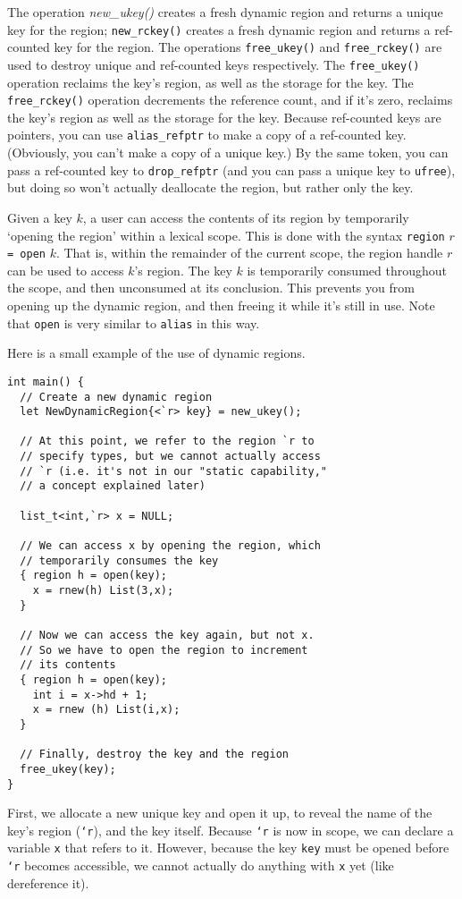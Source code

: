The operation \emph{new\_ukey()} creates a fresh dynamic region and returns
a unique key for the region; \texttt{new\_rckey()} creates a fresh dynamic
region and returns a ref-counted key for the region.  The operations
\texttt{free\_ukey()} and \texttt{free\_rckey()} are used to destroy unique
and ref-counted keys respectively.  The \texttt{free\_ukey()} operation
reclaims the key's region, as well as the storage for the key.  The
\texttt{free\_rckey()} operation decrements the reference count, and if it's
zero, reclaims the key's region as well as the storage for the key.  Because
ref-counted keys are pointers, you can use \texttt{alias\_refptr} to make a
copy of a ref-counted key.  (Obviously, you can't make a copy of a unique
key.)  By the same token, you can pass a ref-counted key to
\texttt{drop\_refptr} (and you can pass a unique key to \texttt{ufree}), but
doing so won't actually deallocate the region, but rather only the key.

Given a key $k$, a user can access the contents of its region by temporarily
`opening the region' within a lexical scope.  This is done with the syntax
\verb+region+ $r$ \verb+= open+ $k$.  That is, within the remainder of the
current scope, the region handle $r$ can be used to access $k$'s region.
The key $k$ is temporarily consumed throughout the scope, and then
unconsumed at its conclusion.  This prevents you from opening up the dynamic
region, and then freeing it while it's still in use.  Note that
\texttt{open} is very similar to \texttt{alias} in this way.

Here is a small example of the use of dynamic regions.
\begin{verbatim}
int main() {
  // Create a new dynamic region
  let NewDynamicRegion{<`r> key} = new_ukey();

  // At this point, we refer to the region `r to
  // specify types, but we cannot actually access
  // `r (i.e. it's not in our "static capability,"
  // a concept explained later)

  list_t<int,`r> x = NULL;

  // We can access x by opening the region, which
  // temporarily consumes the key
  { region h = open(key);
    x = rnew(h) List(3,x);
  }

  // Now we can access the key again, but not x.
  // So we have to open the region to increment
  // its contents
  { region h = open(key);
    int i = x->hd + 1;
    x = rnew (h) List(i,x);
  }

  // Finally, destroy the key and the region
  free_ukey(key);
}
\end{verbatim}
First, we allocate a new unique key and open it up, to reveal the name of
the key's region (\texttt{`r}), and the key itself.  Because \texttt{`r} is
now in scope, we can declare a variable \texttt{x} that refers to it.
However, because the key \texttt{key} must be opened before \texttt{`r}
becomes accessible, we cannot actually do anything with \texttt{x} yet (like
dereference it).

